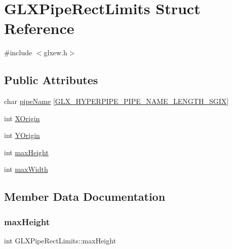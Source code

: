 \hypertarget{struct_g_l_x_pipe_rect_limits}{}\section{G\+L\+X\+Pipe\+Rect\+Limits Struct Reference}
\label{struct_g_l_x_pipe_rect_limits}


{\ttfamily \#include $<$glxew.\+h$>$}

\subsection*{Public Attributes}
\begin{DoxyCompactItemize}
\item 
char \hyperlink{struct_g_l_x_pipe_rect_limits_ae78b4b6656101bc841946733a5b6e5ce}{pipe\+Name} \mbox{[}\hyperlink{glxew_8h_ae1c8261c0861010d8003a31d07e26005}{G\+L\+X\+\_\+\+H\+Y\+P\+E\+R\+P\+I\+P\+E\+\_\+\+P\+I\+P\+E\+\_\+\+N\+A\+M\+E\+\_\+\+L\+E\+N\+G\+T\+H\+\_\+\+S\+G\+IX}\mbox{]}
\item 
int \hyperlink{struct_g_l_x_pipe_rect_limits_a3e5a965059d9f5d2ca42acd35af5bb9b}{X\+Origin}
\item 
int \hyperlink{struct_g_l_x_pipe_rect_limits_a50e06bcf0dae95854be7d93a515199e9}{Y\+Origin}
\item 
int \hyperlink{struct_g_l_x_pipe_rect_limits_a27572e499c0d3280031c2ad8e387c0c1}{max\+Height}
\item 
int \hyperlink{struct_g_l_x_pipe_rect_limits_a8662c7a712b30620e25fc994adf337a1}{max\+Width}
\end{DoxyCompactItemize}


\subsection{Member Data Documentation}
\mbox{\label{struct_g_l_x_pipe_rect_limits_a27572e499c0d3280031c2ad8e387c0c1}} 
\subsubsection{\texorpdfstring{max\+Height}{maxHeight}}
{\footnotesize\ttfamily int G\+L\+X\+Pipe\+Rect\+Limits\+::max\+Height}

